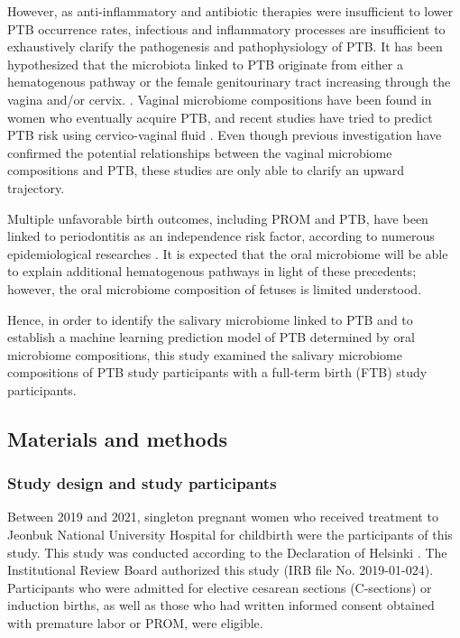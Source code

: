 \documentclass[11pt, a4paper, onecolumn, oneside]{report}
\begin{document}
            However, as anti-inflammatory and antibiotic therapies were insufficient to lower PTB occurrence rates, infectious and inflammatory processes are insufficient to exhaustively clarify the pathogenesis and pathophysiology of PTB. It has been hypothesized that the microbiota linked to PTB originate from either a hematogenous pathway or the female genitourinary tract increasing through the vagina and/or cervix. \cite{PTB-mechanism-3}. Vaginal microbiome compositions have been found in women who eventually acquire PTB, and recent studies have tried to predict PTB risk using cervico-vaginal fluid \cite{PTB-mechanism-4}. Even though previous investigation have confirmed the potential relationships between the vaginal microbiome compositions and PTB, these studies are only able to clarify an upward trajectory.

            Multiple unfavorable birth outcomes, including PROM and PTB, have been linked to periodontitis as an independence risk factor, according to numerous epidemiological researches \cite{PTB-mechanism-5}. It is expected that the oral microbiome will be able to explain additional hematogenous pathways in light of these precedents; however, the oral microbiome composition of fetuses is limited understood.

            Hence, in order to identify the salivary microbiome linked to PTB and to establish a machine learning prediction model of PTB determined by oral microbiome compositions, this study examined the salivary microbiome compositions of PTB study participants with a full-term birth (FTB) study participants.
        \newpage

        \subsection{Materials and methods}
            \subsubsection{Study design and study participants}
                Between 2019 and 2021, singleton pregnant women who received treatment to Jeonbuk National University Hospital for childbirth were the participants of this study. This study was conducted according to the Declaration of Helsinki \cite{Helsinki-1}. The Institutional Review Board authorized this study (IRB file No. 2019-01-024). Participants who were admitted for elective cesarean sections (C-sections) or induction births, as well as those who had written informed consent obtained with premature labor or PROM, were eligible.
\end{document}
